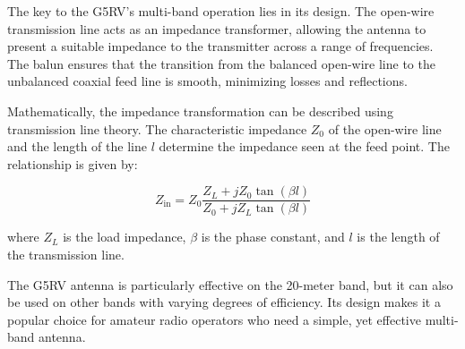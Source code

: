 The key to the G5RV's multi-band operation lies in its design. The open-wire transmission line acts as an impedance transformer, allowing the antenna to present a suitable impedance to the transmitter across a range of frequencies. The balun ensures that the transition from the balanced open-wire line to the unbalanced coaxial feed line is smooth, minimizing losses and reflections.

Mathematically, the impedance transformation can be described using transmission line theory. The characteristic impedance \( Z_0 \) of the open-wire line and the length of the line \( l \) determine the impedance seen at the feed point. The relationship is given by:

\[
Z_{\text{in}} = Z_0 \frac{Z_L + j Z_0 \tan(\beta l)}{Z_0 + j Z_L \tan(\beta l)}
\]

where \( Z_L \) is the load impedance, \( \beta \) is the phase constant, and \( l \) is the length of the transmission line.

The G5RV antenna is particularly effective on the 20-meter band, but it can also be used on other bands with varying degrees of efficiency. Its design makes it a popular choice for amateur radio operators who need a simple, yet effective multi-band antenna.

